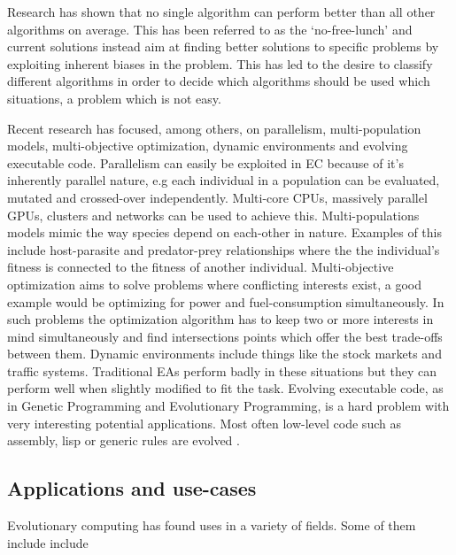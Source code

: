 Research has shown that no single algorithm can perform better than all other algorithms on average. This has been referred to as the `no-free-lunch' and current solutions instead aim at finding better solutions to specific problems by exploiting inherent biases in the problem. This has led to the desire to classify different algorithms in order to decide which algorithms should be used which situations, a problem which is not easy.

Recent research has focused, among others, on parallelism, multi-population models, multi-objective optimization, dynamic environments and evolving executable code. Parallelism can easily be exploited in EC because of it's inherently parallel nature, e.g each individual in a population can be evaluated, mutated and crossed-over independently. Multi-core CPUs, massively parallel GPUs, clusters and networks can be used to achieve this. Multi-populations models mimic the way species depend on each-other in nature. Examples of this include host-parasite and predator-prey relationships where the the individual's fitness is connected to the fitness of another individual. Multi-objective optimization aims to solve problems where conflicting interests exist, a good example would be optimizing for power and fuel-consumption simultaneously. In such problems the optimization algorithm has to keep two or more interests in mind simultaneously and find intersections points which offer the best trade-offs between them. Dynamic environments include things like the stock markets and traffic systems. Traditional EAs perform badly in these situations but they can perform well when slightly modified to fit the task. Evolving executable code, as in Genetic Programming and Evolutionary Programming, is a hard problem with very interesting potential applications. Most often low-level code such as assembly, lisp or generic rules are evolved \cite{dejong2009EC}.

\subsection{Applications and use-cases}

Evolutionary computing has found uses in a variety of fields. Some of them include include

